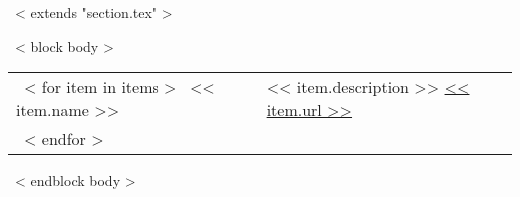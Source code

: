 ~< extends "section.tex" >~

~< block body >~
\begin{tabular}{p{3cm}p{12cm}}
  ~< for item in items >~
    << item.name >> & << item.description >> \href{https://<< item.url >>}{<< item.url >>} \\[1ex]
  ~< endfor >~
\end{tabular}
~< endblock body >~
